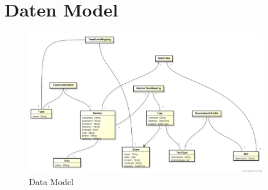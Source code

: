 	\section{Daten Model}
		\begin{figure}[ht]
		    \center
			\includegraphics[width=0.9\textwidth]{content/domainanalyse/images/Datamodell.png}
		    \caption{Data Model}
		\end{figure}